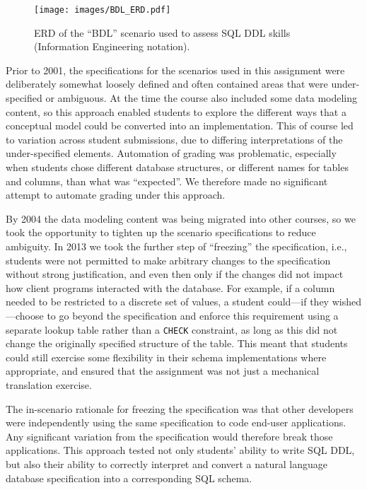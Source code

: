 \documentclass[sigconf, review, anonymous, capitalise]{acmart}
\begin{document}
 
\begin{figure}[hb]
    \centering
    \texttt{[image: images/BDL\_ERD.pdf]} 
    \caption{ERD of the ``BDL'' scenario used to assess SQL DDL skills (Information Engineering notation).}
    \label{fig-ERD}
\end{figure}


Prior to 2001, the specifications for the scenarios used in this assignment were deliberately somewhat loosely defined and often contained areas that were under-specified or ambiguous. At the time the course also included some data modeling content, so this approach enabled students to explore the different ways that a conceptual model could be converted into an implementation. This of course led to variation across student submissions, due to differing interpretations of the under-specified elements. Automation of grading was problematic, especially when students chose different database structures, or different names for tables and columns, than what was ``expected''. We therefore made no significant attempt to automate grading under this approach.

By 2004 the data modeling content was being migrated into other courses, so we took the opportunity to tighten up the scenario specifications to reduce ambiguity. In 2013 we took the further step of ``freezing'' the specification, i.e., students were not permitted to make arbitrary changes to the specification without strong justification, and even then only if the changes did not impact how client programs interacted with the database. For example, if a column needed to be restricted to a discrete set of values, a student could---if they wished---choose to go beyond the specification and enforce this requirement using a separate lookup table rather than a \texttt{CHECK} constraint, as long as this did not change the originally specified structure of the table. This meant that students could still exercise some flexibility in their schema implementations where appropriate, and ensured that the assignment was not just a mechanical translation exercise.

The in-scenario rationale for freezing the specification was that other developers were independently using the same specification to code end-user applications. Any significant variation from the specification would therefore break those applications. This approach tested not only students' ability to write SQL DDL, but also their ability to correctly interpret and convert a natural language database specification into a corresponding SQL schema.
\end{document}
